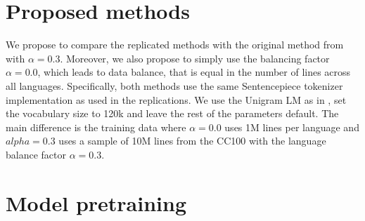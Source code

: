 


\section{Proposed methods}


We propose to compare the replicated methods with the original method from \citet{conneau_unsupervised_2020} with $\alpha=0.3$. Moreover, we also propose to simply use the balancing factor $\alpha=0.0$, which leads to data balance, that is equal in the number of lines across all languages. 
Specifically, both methods use the same Sentencepiece tokenizer implementation as used in the replications. We use the Unigram LM as in \citet{conneau_unsupervised_2020}, set the vocabulary size to 120k and leave the rest of the parameters default. The main difference is the training data where $\alpha=0.0$ uses 1M lines per language and $alpha=0.3$ uses a sample of 10M lines from the CC100 with the language balance factor $\alpha=0.3$. 


\section{Model pretraining}

